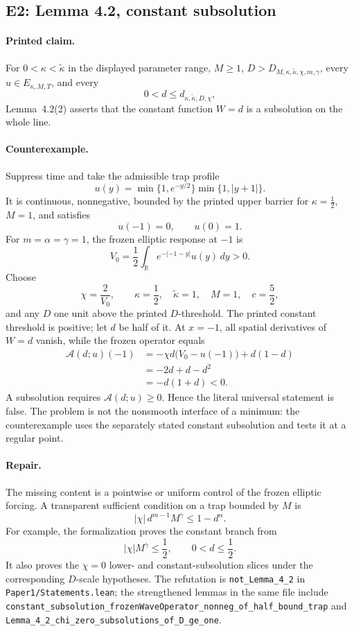 \documentclass[11pt]{article}
\newcommand{\R}{\mathbb{R}}
\newcommand{\abs}[1]{\left\lvert #1\right\rvert}
\newcommand{\code}[1]{\nolinkurl{#1}}
\begin{document}
\subsection{E2: Lemma 4.2, constant subsolution}

\paragraph{Printed claim.}
For \(0<\kappa<\widetilde\kappa\) in the displayed parameter range,
\(M\ge1\), \(D>D_{M,\kappa,\widetilde\kappa,\chi,m,\gamma}\), every
\(u\in E_{\kappa,M,T}\), and every
\[
  0<d\le d_{\kappa,\widetilde\kappa,D,\chi},
\]
Lemma~4.2(2) asserts that the constant function \(W=d\) is a subsolution on
the whole line.

\paragraph{Counterexample.}
Suppress time and take the admissible trap profile
\[
 u(y)=\min\{1,e^{-y/2}\}\min\{1,\abs{y+1}\}.
\]
It is continuous, nonnegative, bounded by the printed upper barrier for
\(\kappa=\frac12\), \(M=1\), and satisfies
\[
  u(-1)=0,\qquad u(0)=1.
\]
For \(m=\alpha=\gamma=1\), the frozen elliptic response at \(-1\) is
\[
  V_0=\frac12\int_\R e^{-\abs{-1-y}}u(y)\,dy>0.
\]
Choose
\[
  \chi=\frac2{V_0},\qquad
  \kappa=\frac12,\quad\widetilde\kappa=1,\quad M=1,\quad c=\frac52,
\]
and any \(D\) one unit above the printed \(D\)-threshold.  The printed
constant threshold is positive; let \(d\) be half of it.  At \(x=-1\), all
spatial derivatives of \(W=d\) vanish, while the frozen operator equals
\[
\begin{aligned}
 \mathcal A(d;u)(-1)
  &= -\chi d\bigl(V_0-u(-1)\bigr)+d(1-d)\\
  &= -2d+d-d^2\\
  &= -d(1+d)<0.
\end{aligned}
\]
A subsolution requires \(\mathcal A(d;u)\ge0\).  Hence the literal universal
statement is false.  The problem is not the nonsmooth interface of a minimum:
the counterexample uses the separately stated constant subsolution and tests
it at a regular point.

\paragraph{Repair.}
The missing content is a pointwise or uniform control of the frozen elliptic
forcing.  A transparent sufficient condition on a trap bounded by \(M\) is
\[
  \abs{\chi}\,d^{m-1}M^\gamma\le 1-d^\alpha.
\]
For example, the formalization proves the constant branch from
\[
  \abs{\chi}M^\gamma\le\frac12,\qquad 0<d\le\frac12.
\]
It also proves the \(\chi=0\) lower- and constant-subsolution slices under
the corresponding \(D\)-scale hypotheses.  The refutation is
\code{not_Lemma_4_2} in \code{Paper1/Statements.lean}; the strengthened
lemmas in the same file include
\code{constant_subsolution_frozenWaveOperator_nonneg_of_half_bound_trap} and
\code{Lemma_4_2_chi_zero_subsolutions_of_D_ge_one}.
\end{document}
